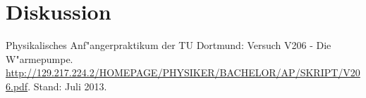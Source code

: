 \section{Diskussion}
\label{sec:diskussion}

\begin{thebibliography}{9}
	 Physikalisches Anf"angerpraktikum der TU Dortmund: Versuch V206 - Die W"armepumpe. \url{http://129.217.224.2/HOMEPAGE/PHYSIKER/BACHELOR/AP/SKRIPT/V206.pdf}. Stand: Juli 2013.
\end{thebibliography}